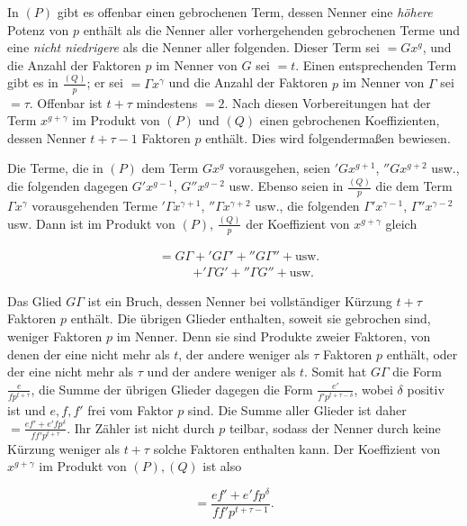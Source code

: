 
In $(P)$ gibt es offenbar einen gebrochenen Term, dessen Nenner eine \emph{höhere} Potenz von $p$ enthält als die Nenner aller vorhergehenden gebrochenen Terme und eine \emph{nicht niedrigere} als die Nenner aller folgenden. Dieser Term sei $=Gx^g$, und die Anzahl der Faktoren $p$ im Nenner von $G$ sei $=t$. Einen entsprechenden Term gibt es in $\frac{(Q)}{p}$; er sei $=\varGamma x^\gamma$ und die Anzahl der Faktoren $p$ im Nenner von $\varGamma$ sei $=\tau$. Offenbar ist $t+\tau$ mindestens $=2$. Nach diesen Vorbereitungen hat der Term $x^{g+\gamma}$ im Produkt von $(P)$ und $(Q)$ einen gebrochenen Koeffizienten, dessen Nenner $t+\tau-1$ Faktoren $p$ enthält. Dies wird folgendermaßen bewiesen.

Die Terme, die in $(P)$ dem Term $Gx^g$ vorausgehen, seien ${}'Gx^{g+1}$, ${}''Gx^{g+2}$ usw., die folgenden dagegen $G'x^{g-1}$, $G''x^{g-2}$ usw. Ebenso seien in $\frac{(Q)}{p}$ die dem Term $\varGamma x^\gamma$ vorausgehenden Terme ${}'\varGamma x^{\gamma+1}$, ${}''\varGamma x^{\gamma+2}$ usw., die folgenden $\varGamma'x^{\gamma-1}$, $\varGamma''x^{\gamma-2}$ usw. Dann ist im Produkt von $(P)$, $\frac{(Q)}{p}$ der Koeffizient von $x^{g+\gamma}$ gleich

\[
\begin{aligned}
&=G\varGamma+{}'G\varGamma'+{}''G\varGamma''+\text{usw.}\\
&\phantom{=G\varGamma}\mathord{+}{}'\varGamma G'+{}''\varGamma G''+\text{usw.}
\end{aligned}
\]

Das Glied $G\varGamma$ ist ein Bruch, dessen Nenner bei vollständiger Kürzung $t+\tau$ Faktoren $p$ enthält. Die übrigen Glieder enthalten, soweit sie gebrochen sind, weniger Faktoren $p$ im Nenner. Denn sie sind Produkte zweier Faktoren, von denen der eine nicht mehr als $t$, der andere weniger als $\tau$ Faktoren $p$ enthält, oder der eine nicht mehr als $\tau$ und der andere weniger als $t$. Somit hat $G\varGamma$ die Form $\frac{e}{fp^{t+\tau}}$, die Summe der übrigen Glieder dagegen die Form $\frac{e'}{f'p^{t+\tau-\delta}}$, wobei $\delta$ positiv ist und $e,f,f'$ frei vom Faktor $p$ sind. Die Summe aller Glieder ist daher $=\frac{ef'+e'fp^\delta}{ff'p^{t+\tau}}$. Ihr Zähler ist nicht durch $p$ teilbar, sodass der Nenner durch keine Kürzung weniger als $t+\tau$ solche Faktoren enthalten kann. Der Koeffizient von $x^{g+\gamma}$ im Produkt von $(P),(Q)$ ist also

\[=\frac{ef'+e'fp^\delta}{ff'p^{t+\tau-1}}.\]

